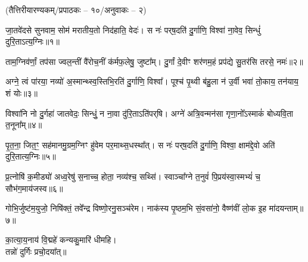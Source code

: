 
\vspace{-1ex}
\centerline{\normalsize (तैत्तिरीयारण्यकम्/प्रपाठकः – १०/अनुवाकः – २)}

जा॒तवे॑दसे सुनवाम॒ सोम॑ मरातीय॒तो निद॑हाति॒ वेदः॑।
स नः॑ पर्‌ष॒दति॑ दु॒र्गाणि॒ विश्वा॑ ना॒वेव॒ सिन्धुं॑ दुरि॒ताऽत्य॒ग्निः॥१॥

ताम॒ग्निव॑र्णां॒ तप॑सा ज्वल॒न्तीं वै॑रोच॒नीं क॑र्मफ॒लेषु॒ जुष्टा᳚म्।
दु॒र्गां दे॒वीꣳ शर॑णम॒हं प्रप॑द्ये सु॒तर॑सि तरसे॒ नमः॑॥२॥

अग्ने॒ त्वं पा॑रया॒ नव्यो॑ अ॒स्मान्थ्स्व॒स्तिभि॒रति॑ दु॒र्गाणि॒ विश्वा᳚।
पूश्च॑ पृ॒थ्वी ब॑हु॒ला न॑ उ॒र्वी भवा॑ तो॒काय॒ तन॑याय॒ शं योः॥३॥

विश्वा॑नि नो दु॒र्गहा॑ जातवेदः॒ सिन्धुं॒ न ना॒वा दु॑रि॒ताऽति॑पर्‌\mbox{}षि।
अग्ने॑ अत्रि॒वन्मन॑सा गृणा॒नो᳚ऽस्माकं॑ बोध्यवि॒ता त॒नूना᳚म्॥४॥

पृ॒त॒ना॒ जित॒ꣳ॒ सह॑मानमु॒ग्रम॒ग्निꣳ हु॑वेम पर॒माथ्स॒धस्था᳚त्।
स नः॑ पर्‌ष॒दति॑ दु॒र्गाणि॒ विश्वा॒ क्षाम॑द्दे॒वो अति॑ दुरि॒तात्य॒ग्निः॥५॥

प्र॒त्नोषि॑ क॒मीड्यो॑ अध्व॒रेषु॑ स॒नाच्च॒ होता॒ नव्य॑श्च॒ सथ्सि॑।
स्वाञ्चा᳚ग्ने त॒नुवं॑ पि॒प्रय॑स्वा॒स्मभ्यं॑ च॒ सौभ॑ग॒माय॑जस्व॥६॥

गोभि॒र्जुष्ट॑म॒युजो॒ निषि॑क्तं॒ तवे᳚न्द्र विष्णो॒रनु॒सञ्च॑रेम।
नाक॑स्य पृ॒ष्ठम॒भि सं॒वसा॑नो॒ वैष्ण॑वीं लो॒क इ॒ह मा॑दयन्ताम्॥७॥
\vspace{-0.5ex}
\begin{center}
का॒त्या॒य॒नाय॑ वि॒द्महे॑ कन्यकु॒मारि॑ धीमहि।\\
 तन्नो॑ दुर्गिः प्रचो॒दया᳚त्॥ 
\end{center}
